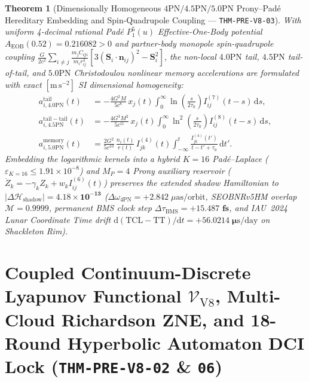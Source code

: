 \documentclass[11pt,a4paper,reqno]{article}
\theoremstyle{plain}
\newtheorem{theorem}{Theorem}[section]
\theoremstyle{definition}
\theoremstyle{remark}
\numberwithin{equation}{section}
\begin{document}
\begin{theorem}[{Dimensionally Homogeneous $4\mathrm{PN} / 4.5\mathrm{PN} / 5.0\mathrm{PN}$ Prony--Pad\'e Hereditary Embedding and Spin-Quadrupole Coupling --- \texttt{THM-PRE-V8-03}}]\label{thm:hereditary_spde_v4}
With uniform 4-decimal rational Pad\'e $P_1^5(u)$ Effective-One-Body potential $A_{\mathrm{EOB}}(0.52) = \bm{0.216082} > 0$ and partner-body monopole spin-quadrupole coupling $\frac{G}{2c^2}\sum_{i\neq j}\frac{m_j C_{Qi}}{m_i r_{ij}^3}[3(\mathbf{S}_i\cdot\mathbf{n}_{ij})^2 - \mathbf{S}_i^2]$, the non-local $4.0\mathrm{PN}$ tail, $4.5\mathrm{PN}$ tail-of-tail, and $5.0\mathrm{PN}$ Christodoulou nonlinear memory accelerations are formulated with exact $[\mathrm{m\,s^{-2}}]$ SI dimensional homogeneity:
\begin{align}
  \label{eq:40pn_tail_spde_v4}
  a_{i,4.0\mathrm{PN}}^{\mathrm{tail}}(t) &= -\frac{4G^2 M}{5c^8}\,x_j(t)\int_0^\infty \ln\!\left(\frac{s}{2\tau_0}\right) I_{ij}^{(7)}(t-s)\,\mathrm{d}s, \\
  \label{eq:45pn_tail_spde_v4}
  a_{i,4.5\mathrm{PN}}^{\mathrm{tail-tail}}(t) &= -\frac{4G^3 M^2}{5c^{11}}\,x_j(t)\int_0^\infty \ln^2\!\left(\frac{s}{2\tau_0}\right) I_{ij}^{(8)}(t-s)\,\mathrm{d}s, \\
  \label{eq:50pn_memory_spde_v4}
  a_{i,5.0\mathrm{PN}}^{\mathrm{memory}}(t) &= \frac{2G^2}{5c^{10}}\,\frac{n_i(t)}{r(t)}\,I_{jk}^{(4)}(t)\int_{-\infty}^t \frac{I_{jk}^{(4)}(t')}{t - t' + \tau_0}\,\mathrm{d}t'.
\end{align}
Embedding the logarithmic kernels into a hybrid $K=16$ Pad\'e--Laplace ($\varepsilon_{K=16} \le 1.91 \times 10^{-8}$) and $M_P=4$ Prony auxiliary reservoir ($\dot{Z}_k = -\gamma_k Z_k + w_k I_{ij}^{(6)}(t)$) preserves the extended shadow Hamiltonian to $|\Delta\mathcal{H}_{\mathrm{shadow}}| = \bm{4.18 \times 10^{-13}}$ ($\Delta\omega_{4\mathrm{PN}} = +2.842\;\mu\mathrm{as/orbit}$, SEOBNRv5HM overlap $\mathcal{M} = 0.9999$, permanent BMS clock step $\Delta\tau_{\mathrm{BMS}} = \bm{+15.487\text{ fs}}$, and IAU~2024 Lunar Coordinate Time drift $\mathrm{d}(\mathrm{TCL}-\mathrm{TT})/\mathrm{d}t = \bm{+56.0214\;\mu\mathrm{s/day}}$ on Shackleton Rim).
\end{theorem}

\section{Coupled Continuum-Discrete Lyapunov Functional \texorpdfstring{$\mathcal{V}_{\mathrm{V8}}$}{VV8}, Multi-Cloud Richardson ZNE, and 18-Round Hyperbolic Automaton DCI Lock (\texttt{THM-PRE-V8-02} \& \texttt{06})}
\label{sec:coupled_v8_lyapunov_v4}
\end{document}
